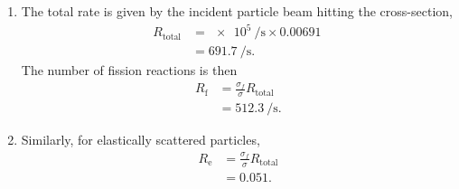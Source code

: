 \documentclass{homework}
\begin{document}
\begin{enumerate}
\begin{enumerate}
				\item %
					The total rate is given by the incident particle beam hitting the cross-section, \begin{align*}
						R_\mathrm{total} & = \SI{e5}{\per\s} \times \SI{0.00691}{} \\
							& = \SI{691.7}{\per\s}.
					\end{align*}
					The number of fission reactions is then \begin{align*}
						R_\mathrm{f} & = \frac{\sigma_f}{\sigma} R_\mathrm{total} \\
							& = \SI{512.3}{\per\s}.
					\end{align*}
				\item %
					Similarly, for elastically scattered particles, \begin{align*}
						R_\mathrm{e} & = \frac{\sigma_f}{\sigma} R_\mathrm{total} \\
							& = 0.051.
					\end{align*}
			\end{enumerate}
	\end{enumerate}
\end{document}
